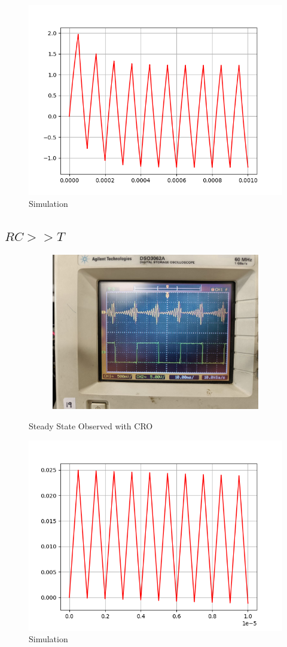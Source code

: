 \documentclass[journal]{IEEEtran}
\begin{document}
\begin{figure}[H]
    \centering
    \includegraphics[width=0.6\columnwidth]{figs/fig1.png}
    \caption{Simulation}
\end{figure}

\subsection{$RC >> T$}

\begin{figure}[H]
    \centering
    \begin{subfigure}[t]{0.4\textwidth}
        \centering
        \includegraphics[width=1\columnwidth]{pics/6109622319392604813.jpg}
    \end{subfigure}
    \caption{Steady State Observed with CRO}
\end{figure}

\begin{figure}[H]
    \centering
    \includegraphics[width=0.6\columnwidth]{figs/fig3.png}
    \caption{Simulation}
\end{figure}
\end{document}
